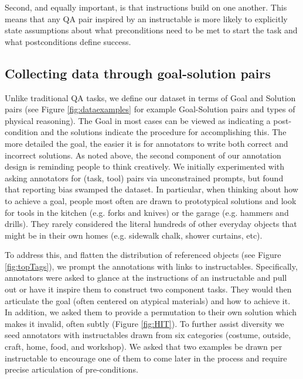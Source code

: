 Second, and equally important, is that instructions build on one another.  This means that any QA pair inspired by an instructable is more likely to explicitly state assumptions about what preconditions need to be met to start the task and what postconditions define success.

\subsection{Collecting data through goal-solution pairs} Unlike traditional QA tasks, we define our dataset in terms of Goal and Solution pairs (see Figure \ref{fig:dataexamples} for example Goal-Solution pairs and types of physical reasoning).  The Goal in most cases can be viewed as indicating a post-condition and the solutions indicate the procedure for accomplishing this.  The more detailed the goal, the easier it is for annotators to write both correct and incorrect solutions.  As noted above, the second component of our annotation design is reminding people to think creatively. We initially experimented with asking annotators for (task, tool) pairs via unconstrained prompts, but found that reporting bias swamped the dataset.  In particular, when thinking about how to achieve a goal, people most often are drawn to prototypical solutions and look for tools in the kitchen (e.g. forks and knives) or the garage (e.g. hammers and drills).  They rarely considered the literal hundreds of other everyday objects that might be in their own homes (e.g. sidewalk chalk, shower curtains, etc).  

To address this, and flatten the distribution of referenced objects (see Figure \ref{fig:topTags}), we prompt the annotations with links to instructables.  Specifically, annotators were asked to glance at the instructions of an instructable and pull out or have it inspire them to construct two component tasks.  They would then articulate the goal (often centered on atypical materials) and how to achieve it.  In addition, we asked them to provide a permutation to their own solution which makes it invalid, often subtly (Figure \ref{fig:HIT}). To further assist diversity we seed annotators with instructables drawn from six categories (costume, outside, craft, home, food, and workshop).  We asked that two examples be drawn per instructable to encourage one of them to come later in the process and require precise articulation of pre-conditions.

